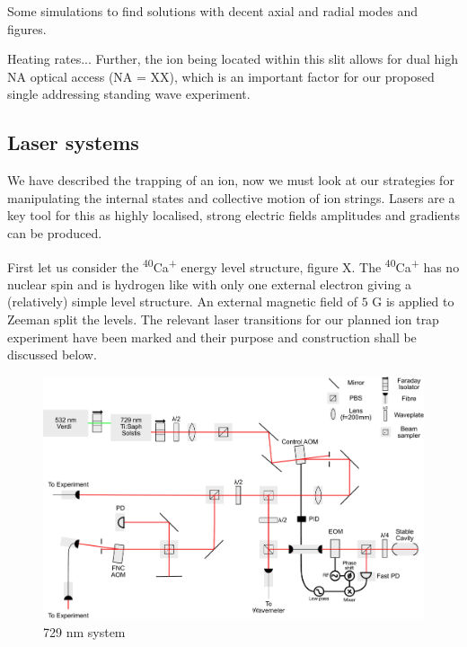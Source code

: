 \documentclass[12pt]{iopart}
\begin{document}
Some simulations to find solutions with decent axial and radial modes and figures.

Heating rates... Further, the ion being located within this
slit allows for dual high NA optical access (NA = XX), which is an
important factor for our proposed single addressing standing wave
experiment.

\subsection{Laser systems}

We have described the trapping of an ion, now we must look at our
strategies for manipulating the internal states and collective motion
of ion strings. Lasers are a key tool for this as highly localised,
strong electric fields amplitudes and gradients can be produced.

First let us consider the \textsuperscript{40}Ca\textsuperscript{+} energy
level structure, figure X. The \textsuperscript{40}Ca\textsuperscript{+} has
no nuclear spin and is hydrogen like with only one external electron
giving a (relatively) simple level structure. An external magnetic
field of $5$ G is applied to Zeeman split the levels. The relevant
laser transitions for our planned ion trap experiment have been marked
and their purpose and construction shall be discussed below.\\

\begin{figure}
  \begin{center}
   \noindent\includegraphics[width=\linewidth]{figures/729_path_small.pdf}
  \end{center}
  \caption{729 nm system}
  \label{fig:729}
\end{figure}
\end{document}
